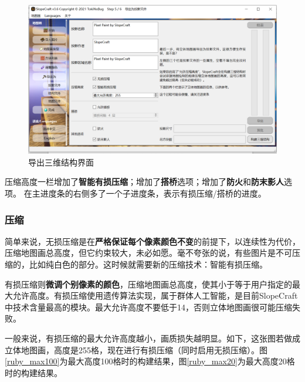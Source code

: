 \documentclass[UTF8]{ctexart}
\begin{document}
    \begin{figure}[htbp]
        \centering
        \includegraphics[width=15cm]{Img2_Export3D.png}
        \caption{导出三维结构界面}
    \end{figure}

    压缩高度一栏增加了\textbf{智能有损压缩}；增加了\textbf{搭桥}选项；增加了\textbf{防火}和\textbf{防末影人}选项。 在主进度条的右侧多了一个子进度条，表示有损压缩/搭桥的进度。
        
    \subsubsection{压缩}
    简单来说，无损压缩是在\textbf{严格保证每个像素颜色不变}的前提下，以连续性为代价，压缩地图画总高度，但它约束较大，未必如愿。毫不夸张的说，有些图片是不可压缩的，比如纯白色的部分。这时候就需要新的压缩技术：智能有损压缩。

    有损压缩则\textbf{微调个别像素的颜色}，压缩地图画总高度，使其小于等于用户指定的最大允许高度。有损压缩使用遗传算法实现，属于群体人工智能，是目前SlopeCraft中技术含量最高的模块。最大允许高度不要低于14，否则立体地图画很可能压缩失败。

    一般来说，有损压缩的最大允许高度越小，画质损失越明显。如下，这张图若做成立体地图画，高度是255格，现在进行有损压缩（同时启用无损压缩）。图\ref*{ruby_max100}为最大高度100格时的构建结果，图\ref*{ruby_max20}为最大高度20格时的构建结果。
\end{document}
